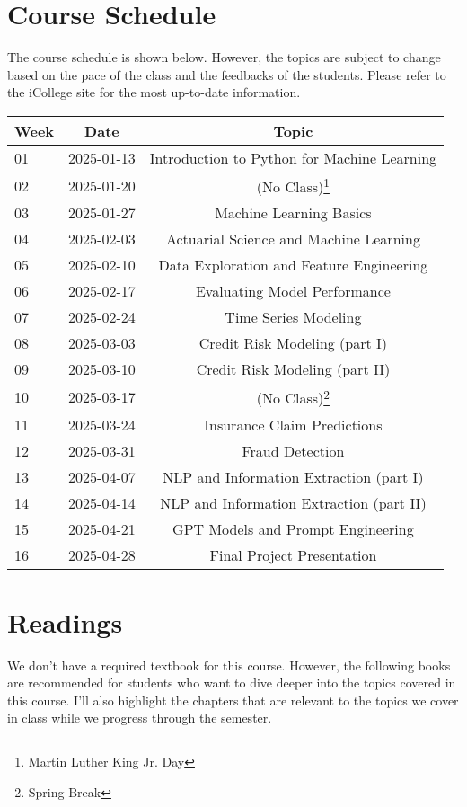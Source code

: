 \documentclass[a4paper, 12pt]{article}
\begin{document}
\section{Course Schedule}
The course schedule is shown below. However, the topics are subject to change based on the pace of the class and the feedbacks of the students. Please refer to the iCollege site for the most up-to-date information.

\begin{center}
    \begin{tabular}{ l | c | c }
        \hline			
        Week & Date & Topic\\
        \hline
        01 & 2025-01-13 & Introduction to Python for Machine Learning\\
        02 & 2025-01-20 & (No Class)\footnote{Martin Luther King Jr. Day}\\
        03 & 2025-01-27 & Machine Learning Basics\\
        04 & 2025-02-03 & Actuarial Science and Machine Learning\\
        05 & 2025-02-10 & Data Exploration and Feature Engineering\\
        06 & 2025-02-17 & Evaluating Model Performance\\
        07 & 2025-02-24 & Time Series Modeling\\
        08 & 2025-03-03 & Credit Risk Modeling (part I)\\
        09 & 2025-03-10 & Credit Risk Modeling (part II)\\
        10 & 2025-03-17 & (No Class)\footnote{Spring Break}\\
        11 & 2025-03-24 & Insurance Claim Predictions\\
        12 & 2025-03-31 & Fraud Detection\\
        13 & 2025-04-07 & NLP and Information Extraction (part I)\\
        14 & 2025-04-14 & NLP and Information Extraction (part II)\\
        15 & 2025-04-21 & GPT Models and Prompt Engineering\\
        16 & 2025-04-28 & Final Project Presentation\\
        \hline  
    \end{tabular}
\end{center}

\section{Readings}
We don't have a required textbook for this course. However, the following books are recommended for students who want to dive deeper into the topics covered in this course. I'll also highlight the chapters that are relevant to the topics we cover in class while we progress through the semester.
\end{document}
